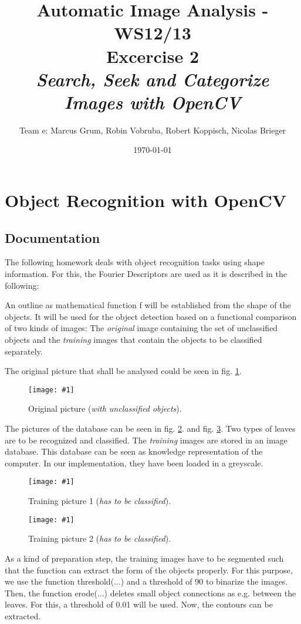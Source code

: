 \documentclass[a4paper,headings=small]{scrartcl}
\title{Automatic Image Analysis - WS12/13 \\ Excercise 2 \\ \emph{Search, Seek and Categorize Images with OpenCV}}
\author{Team e: Marcus Grum, Robin Vobruba, Robert Koppisch, Nicolas Brieger}
\date{\today}
\numberwithin{equation}{section} %
\numberwithin{figure}{section}   %
\newcommand{\image}[3]{
	\begin{figure}[htbp]
		\centering
		\texttt{[image: \#1]}
		\caption{#3}
		\label{fig:#1}
	\end{figure}
}
\begin{document}
\maketitle



\section{Object Recognition with OpenCV}


\subsection{Documentation}

The following homework deals with object recognition tasks using shape information.
For this, the Fourier Descriptors are used as it is described in the following:

An outline as mathematical function f will be established from the shape of the objects.
It will be used for the object detection based on a functional comparison of two kinds of images:
The \emph{original} image containing the set of unclassified objects 
and the \emph{training} images that contain the objects to be classified separately.

The original picture that shall be analysed could be seen in fig. \ref{fig:../../../target/pic_input}.

\image{../../../target/pic_input}{0.5}{%
		Original picture (\emph{with unclassified objects}).}

The pictures of the database can be seen in fig. \ref{fig:../../../target/pic_db1}.
and fig. \ref{fig:../../../target/pic_db2}. Two types of leaves are to be
recognized and classified. The \emph{training} images are stored in an image database. 
This database can be seen as knowledge representation of the computer. 
In our implementation, they have been loaded in a greyscale.

\image{../../../target/pic_db1}{0.2}{%
		Training picture 1 (\emph{has to be classified}).}
\image{../../../target/pic_db2}{0.5}{%
		Training picture 2 (\emph{has to be classified}).}

As a kind of preparation step, the training images have to be segmented such that the 
function can extract the form of the objects properly.
For this purpose, we use the function threshold(...) and a threshold of 90 to binarize the images.
Then, the function erode(...) deletes small object connections as e.g. between the leaves.
For this, a threshold of 0.01 will be used.
Now, the contours can be extracted.
\end{document}

